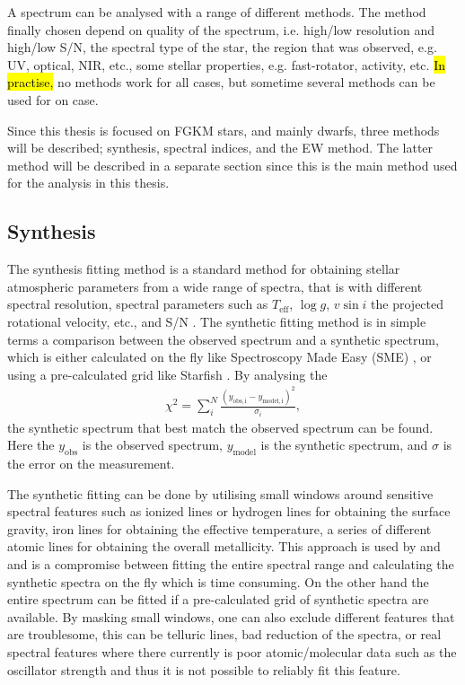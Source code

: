 A spectrum can be analysed with a range of different methods. The method finally chosen depend on
quality of the spectrum, i.e. high/low resolution and high/low S/N, the spectral type of the star,
the region that was observed, e.g. UV, optical, NIR, etc., some stellar properties, e.g.
fast-rotator, activity, etc. \hl{In practise,} no methods work for all cases, but sometime several
methods can be used for on case.

Since this thesis is focused on FGKM stars, and mainly dwarfs, three methods will be described;
synthesis, spectral indices, and the EW method. The latter method will be described in a separate
section since this is the main method used for the analysis in this thesis.



\subsection{Synthesis}
\label{sec:synthesis}

The synthesis fitting method is a standard method for obtaining stellar atmospheric parameters from
a wide range of spectra, that is with different spectral resolution, spectral parameters such as
$T_\mathrm{eff}$, $\log g$, $v\sin i$ the projected rotational velocity, etc., and S/N  \citep[see
e.g.][]{Tsantaki2017}. The synthetic fitting method is in simple terms a comparison between the
observed spectrum and a synthetic spectrum, which is either calculated on the fly like Spectroscopy
Made Easy (SME) \citep{Valenti1996}, or using a pre-calculated grid like Starfish
\citep{Czekala2015}. By analysing the
\begin{align}
  \chi^2 = \sum_i^N\frac{(y_\mathrm{obs,i}-y_\mathrm{model,i})^2}{\sigma_i},
\end{align}
the synthetic spectrum that best match the observed spectrum can be found. Here the $y_\mathrm{obs}$
is the observed spectrum, $y_\mathrm{model}$ is the synthetic spectrum, and $\sigma$ is the error on
the measurement.

The synthetic fitting can be done by utilising small windows around sensitive spectral features such
as ionized lines or hydrogen lines for obtaining the surface gravity, iron lines for obtaining the
effective temperature, a series of different atomic lines for obtaining the overall metallicity.
This approach is used by  and 
\citep[][respectively]{Valenti1996,Tsantaki2017} and is a compromise between fitting the entire
spectral range and calculating the synthetic spectra on the fly which is time consuming. On the
other hand the entire spectrum can be fitted if a pre-calculated grid of synthetic spectra are
available. By masking small windows, one can also exclude different features that are troublesome,
this can be telluric lines, bad reduction of the spectra, or real spectral features where there
currently is poor atomic/molecular data such as the oscillator strength and thus it is not possible
to reliably fit this feature.

